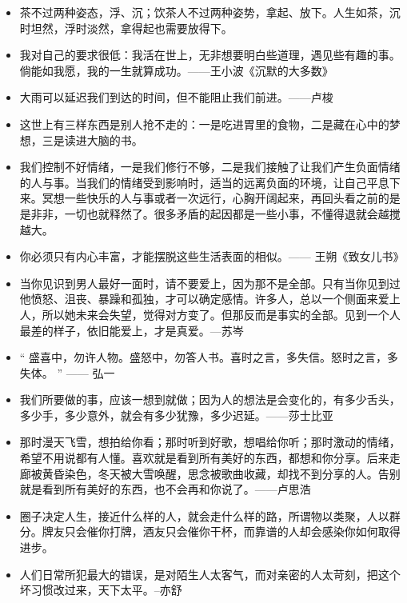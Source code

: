 \documentclass[UTF8,a4paper,8pt]{ctexbook}
\begin{document}
\begin{itemize}
		\item 茶不过两种姿态，浮、沉；饮茶人不过两种姿势，拿起、放下。人生如茶，沉时坦然，浮时淡然，拿得起也需要放得下。
		
		\item 我对自己的要求很低：我活在世上，无非想要明白些道理，遇见些有趣的事。倘能如我愿，我的一生就算成功。——王小波《沉默的大多数》
		
		\item 大雨可以延迟我们到达的时间，但不能阻止我们前进。——卢梭
		
		\item 这世上有三样东西是别人抢不走的：一是吃进胃里的食物，二是藏在心中的梦想，三是读进大脑的书。
		
		\item 我们控制不好情绪，一是我们修行不够，二是我们接触了让我们产生负面情绪的人与事。当我们的情绪受到影响时，适当的远离负面的环境，让自己平息下来。冥想一些快乐的人与事或者一次远行，心胸开阔起来，再回头看之前的是是非非，一切也就释然了。很多矛盾的起因都是一些小事，不懂得退就会越搅越大。
		
		\item 你必须只有内心丰富，才能摆脱这些生活表面的相似。—— 王朔《致女儿书》
		
		\item 当你见识到男人最好一面时，请不要爱上，因为那不是全部。只有当你见到过他愤怒、沮丧、暴躁和孤独，才可以确定感情。许多人，总以一个侧面来爱上人，所以她未来会失望，觉得对方变了。但那反而是事实的全部。见到一个人最差的样子，依旧能爱上，才是真爱。---苏岑
		
		\item “ 盛喜中，勿许人物。盛怒中，勿答人书。喜时之言，多失信。怒时之言，多失体。 ” —— 弘一
		
		\item 我们所要做的事，应该一想到就做；因为人的想法是会变化的，有多少舌头，多少手，多少意外，就会有多少犹豫，多少迟延。——莎士比亚
		
		\item 那时漫天飞雪，想拍给你看；那时听到好歌，想唱给你听；那时激动的情绪，希望不用说都有人懂。喜欢就是看到所有美好的东西，都想和你分享。后来走廊被黄昏染色，冬天被大雪唤醒，思念被歌曲收藏，却找不到分享的人。告别就是看到所有美好的东西，也不会再和你说了。——卢思浩
		
		\item 圈子决定人生，接近什么样的人，就会走什么样的路，所谓物以类聚，人以群分。牌友只会催你打牌，酒友只会催你干杯，而靠谱的人却会感染你如何取得进步。
		
		\item 人们日常所犯最大的错误，是对陌生人太客气，而对亲密的人太苛刻，把这个坏习惯改过来，天下太平。--亦舒
		

\end{itemize}
\end{document}
